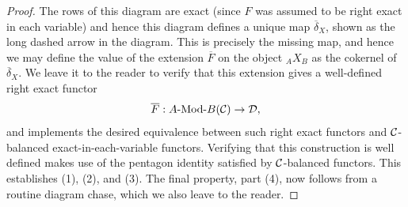 \documentclass{amsart}
\begin{document}
\begin{proof}
The rows of this diagram are exact (since $F$ was assumed to be right exact in each variable) and hence this diagram defines a unique map $\overline{\delta}_X$, shown as the long dashed arrow in the diagram. This is precisely the missing map, and hence we may define the value of the extension $\overline{F}$ on the object ${}_AX_B$ as the cokernel of $\overline{\delta}_X$. We leave it to the reader to verify that this extension gives a well-defined right exact functor 
\begin{equation*}
	\overline{F}: \Mod{A}{B}(\cC) \to \cD,
\end{equation*} 
and implements the desired equivalence between such right exact functors and $\mathcal C$-balanced exact-in-each-variable functors. Verifying that this construction is well defined makes use of the pentagon identity satisfied by $\mathcal C$-balanced functors. This establishes (1), (2), and (3). The final property, part (4), now follows from a routine diagram chase, which we also leave to the reader. 
\end{proof}

\end{document}
